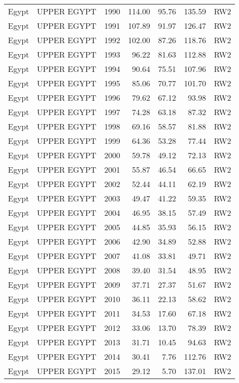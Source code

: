 \begin{longtable}{lllrrrl}
  Egypt & UPPER EGYPT & 1990 & 114.00 & 95.76 & 135.59 & RW2 \\ 
  Egypt & UPPER EGYPT & 1991 & 107.89 & 91.97 & 126.47 & RW2 \\ 
  Egypt & UPPER EGYPT & 1992 & 102.00 & 87.26 & 118.76 & RW2 \\ 
  Egypt & UPPER EGYPT & 1993 & 96.22 & 81.63 & 112.88 & RW2 \\ 
  Egypt & UPPER EGYPT & 1994 & 90.64 & 75.51 & 107.96 & RW2 \\ 
  Egypt & UPPER EGYPT & 1995 & 85.06 & 70.77 & 101.70 & RW2 \\ 
  Egypt & UPPER EGYPT & 1996 & 79.62 & 67.12 & 93.98 & RW2 \\ 
  Egypt & UPPER EGYPT & 1997 & 74.28 & 63.18 & 87.32 & RW2 \\ 
  Egypt & UPPER EGYPT & 1998 & 69.16 & 58.57 & 81.88 & RW2 \\ 
  Egypt & UPPER EGYPT & 1999 & 64.36 & 53.28 & 77.44 & RW2 \\ 
  Egypt & UPPER EGYPT & 2000 & 59.78 & 49.12 & 72.13 & RW2 \\ 
  Egypt & UPPER EGYPT & 2001 & 55.87 & 46.54 & 66.65 & RW2 \\ 
  Egypt & UPPER EGYPT & 2002 & 52.44 & 44.11 & 62.19 & RW2 \\ 
  Egypt & UPPER EGYPT & 2003 & 49.47 & 41.22 & 59.35 & RW2 \\ 
  Egypt & UPPER EGYPT & 2004 & 46.95 & 38.15 & 57.49 & RW2 \\ 
  Egypt & UPPER EGYPT & 2005 & 44.85 & 35.93 & 56.15 & RW2 \\ 
  Egypt & UPPER EGYPT & 2006 & 42.90 & 34.89 & 52.88 & RW2 \\ 
  Egypt & UPPER EGYPT & 2007 & 41.08 & 33.81 & 49.71 & RW2 \\ 
  Egypt & UPPER EGYPT & 2008 & 39.40 & 31.54 & 48.95 & RW2 \\ 
  Egypt & UPPER EGYPT & 2009 & 37.71 & 27.37 & 51.67 & RW2 \\ 
  Egypt & UPPER EGYPT & 2010 & 36.11 & 22.13 & 58.62 & RW2 \\ 
  Egypt & UPPER EGYPT & 2011 & 34.53 & 17.60 & 67.18 & RW2 \\ 
  Egypt & UPPER EGYPT & 2012 & 33.06 & 13.70 & 78.39 & RW2 \\ 
  Egypt & UPPER EGYPT & 2013 & 31.71 & 10.45 & 94.63 & RW2 \\ 
  Egypt & UPPER EGYPT & 2014 & 30.41 & 7.76 & 112.76 & RW2 \\ 
  Egypt & UPPER EGYPT & 2015 & 29.12 & 5.70 & 137.01 & RW2 \\ 

\end{longtable}
